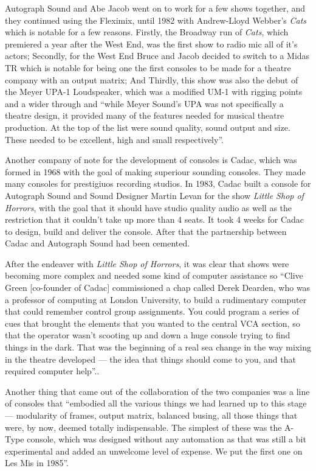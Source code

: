\documentclass[12pt]{article}
\begin{document}
\begin{doublespace}
Autograph Sound and Abe Jacob went on to work for a few shows together, and they continued using the Fleximix, until 1982 with Andrew-Lloyd Webber's \textit{Cats} which is notable for a few reasons. Firstly, the Broadway run of \textit{Cats}, which premiered a year after the West End, was the first show to radio mic all of it's actors; Secondly, for the West End Bruce and Jacob decided to switch to a Midas TR which is notable for being one the first consoles to be made for a theatre company with an output matrix\autocite{bruceTheatreSoundDigital}; And Thirdly, this show was also the debut of the Meyer UPA-1 Loudspeaker, which was a modified UM-1 with rigging points and a wider through and ``while Meyer Sound's UPA was not specifically a theatre design, it provided many of the features needed for musical theatre production. At the top of the list were sound quality, sound output and size. These needed to be excellent, high and small respectively''.\autocite{TheatricalAddressLoudspeakers}
\par Another company of note for the development of consoles is Cadac, which was formed in 1968 with the goal of making superiour sounding consoles. They made many consoles for prestigiuos recording studios. In 1983, Cadac built a console for Autograph Sound and Sound Designer Martin Levan for the show \textit{Little Shop of Horrors}, with the goal that it should have studio quality audio as well as the restriction that it couldn't take up more than 4 seats. It took 4 weeks for Cadac to design, build and deliver the console.\autocite{CadacConsolesCadac}\autocite{bruceTheatreSoundDigital} After that the partnership between Cadac and Autograph Sound had been cemented.
\par After the endeaver with \textit{Little Shop of Horrors}, it was clear that shows were becoming more complex and needed some kind of computer assistance so ``Clive Green [co-founder of Cadac] commissioned a chap called Derek Dearden, who was a professor of computing at London University, to build a rudimentary computer that could remember control group assignments. You could program a series of cues that brought the elements that you wanted to the central VCA section, so that the operator wasn't scooting up and down a huge console trying to find things in the dark. That was the beginning of a real sea change in the way mixing in the theatre developed --- the idea that things should come to you, and that required computer help''.\autocite{bruceTheatreSoundDigital}.
\par Another thing that came out of the collaboration of the two companies was a line of consoles that ``embodied all the various things we had learned up to this stage --- modularity of frames, output matrix, balanced busing, all those things that were, by now, deemed totally indispensable. The simplest of these was the A-Type console, which was designed without any automation as that was still a bit experimental and added an unwelcome level of expense. We put the first one on Les Mis in 1985''.\autocite{bruceTheatreSoundDigital}

\end{doublespace}
\end{document}
